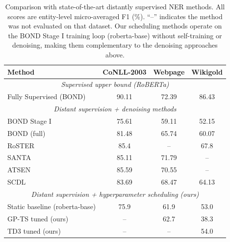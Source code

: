 \begin{table}[t]
\centering
\small
\begin{tabular}{lccc}
\toprule
\textbf{Method} & \textbf{CoNLL-2003} & \textbf{Webpage} & \textbf{Wikigold} \\
\midrule
\multicolumn{4}{c}{\textit{Supervised upper bound (RoBERTa)}} \\
\quad Fully Supervised (BOND) & 90.11 & 72.39 & 86.43 \\
\midrule
\multicolumn{4}{c}{\textit{Distant supervision + denoising methods}} \\
\quad BOND Stage I \cite{liang2020bond} & 75.61 & 59.11 & 52.15 \\
\quad BOND (full) \cite{liang2020bond} & 81.48 & 65.74 & 60.07 \\
\quad RoSTER \cite{meng2021roster} & 85.4 & -- & 67.8 \\
\quad SANTA \cite{shao2023santa} & 85.11 & 71.79 & -- \\
\quad ATSEN \cite{zhang2021atsen} & 85.59 & 70.55 & -- \\
\quad SCDL \cite{zhang2022scdl} & 83.69 & 68.47 & 64.13 \\
\midrule
\multicolumn{4}{c}{\textit{Distant supervision + hyperparameter scheduling (ours)}} \\
\quad Static baseline (roberta-base) & 75.9 & 61.9 & 53.0 \\
\quad GP-TS tuned (ours) & -- & 62.7 & 38.3 \\
\quad TD3 tuned (ours) & -- & -- & 54.0 \\
\bottomrule
\end{tabular}
\caption{Comparison with state-of-the-art distantly supervised NER methods. All scores are entity-level micro-averaged F1 (\%). ``--'' indicates the method was not evaluated on that dataset. Our scheduling methods operate on the BOND Stage I training loop (roberta-base) without self-training or denoising, making them complementary to the denoising approaches above.}
\label{tab:sota-comparison}
\end{table}
